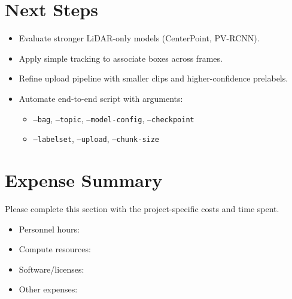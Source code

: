 \documentclass[11pt,a4paper]{report}
\begin{document}
\chapter{Next Steps}
\begin{itemize}[leftmargin=2em]
    \item Evaluate stronger LiDAR-only models (CenterPoint, PV-RCNN).
    \item Apply simple tracking to associate boxes across frames.
    \item Refine upload pipeline with smaller clips and higher-confidence prelabels.
    \item Automate end-to-end script with arguments:
    \begin{itemize}[leftmargin=2em]
        \item \texttt{--bag}, \texttt{--topic}, \texttt{--model-config}, \texttt{--checkpoint}
        \item \texttt{--labelset}, \texttt{--upload}, \texttt{--chunk-size}
    \end{itemize}
\end{itemize}

\chapter{Expense Summary}
Please complete this section with the project-specific costs and time spent.
\begin{itemize}[leftmargin=2em]
    \item Personnel hours: \underline{\hspace{5cm}}
    \item Compute resources: \underline{\hspace{6cm}}
    \item Software/licenses: \underline{\hspace{6cm}}
    \item Other expenses: \underline{\hspace{6cm}}
\end{itemize}
\end{document}
